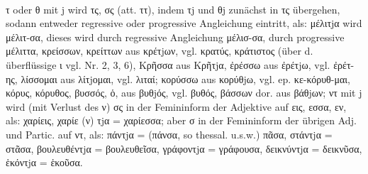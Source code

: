   \paragraph{} τ oder θ mit j wird τς, σς (att.  ττ), indem τj und θj
  zunächst in τς übergehen, sodann entweder regressive oder progressive
  Angleichung eintritt, als: μέλιτjα wird μέλιτ-σα, dieses wird durch regressive
  Angleichung μέλισ-σα, durch progressive μέλιττα, κρείσσων, κρείττων aus
  κρέτjων, vgl. κρατύς, κράτιστος (über d. überflüssige ι vgl. Nr. 2, 3, 6),
  Κρῆσσα aus Κρῆτjα, ἐρέσσω aus ἐρέτjω, vgl. ἐρέτ-ης, λίσσομαι aus λίτjομαι,
  vgl. λιταί; κορύσσω aus κορύθjω, vgl. ep. κε-κόρυθ-μαι, κόρυς, κόρυθος,
  βυσσός, ὁ, aus βυθjός, vgl. βυθός, βάσσων dor. aus βάθjων; ντ mit j wird (mit
  Verlust des ν) σς in der Femininform der Adjektive auf εις, εσσα, εν, als:
  χαρίεις, χαρίε (ν) τjα = χαρίεσσα; aber σ in der Femininform der übrigen Adj.
  und Partic. auf ντ, als: πάντjα = (πάνσα, so thessal. u.s.w.) πᾶσα, στάντjα
  = στᾶσα, βουλευθέντjα = βουλευθεῖσα, γράφοντjα = γράφουσα, δεικνύντjα =
  δεικνῦσα, ἑκόντjα = ἑκοῦσα. 

